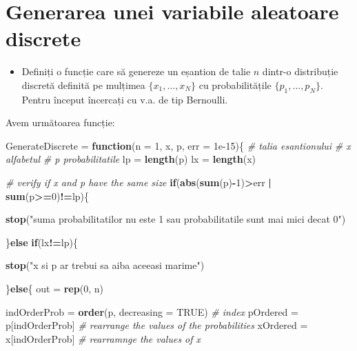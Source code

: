 \documentclass[]{article}
\newenvironment{Shaded}{\begin{snugshade}}{\end{snugshade}}
\newcommand{\KeywordTok}[1]{\textcolor[rgb]{0.13,0.29,0.53}{\textbf{#1}}}
\newcommand{\DataTypeTok}[1]{\textcolor[rgb]{0.13,0.29,0.53}{#1}}
\newcommand{\DecValTok}[1]{\textcolor[rgb]{0.00,0.00,0.81}{#1}}
\newcommand{\FloatTok}[1]{\textcolor[rgb]{0.00,0.00,0.81}{#1}}
\newcommand{\StringTok}[1]{\textcolor[rgb]{0.31,0.60,0.02}{#1}}
\newcommand{\CommentTok}[1]{\textcolor[rgb]{0.56,0.35,0.01}{\textit{#1}}}
\newcommand{\OtherTok}[1]{\textcolor[rgb]{0.56,0.35,0.01}{#1}}
\newcommand{\ControlFlowTok}[1]{\textcolor[rgb]{0.13,0.29,0.53}{\textbf{#1}}}
\newcommand{\OperatorTok}[1]{\textcolor[rgb]{0.81,0.36,0.00}{\textbf{#1}}}
\newcommand{\NormalTok}[1]{#1}
\newenvironment{frshaded*}{%
  \def\FrameCommand{\fboxrule=\FrameRule\fboxsep=\FrameSep \fcolorbox{framecolor}{shadecolor1}}%
  \MakeFramed {\advance\hsize-\width \FrameRestore}}%
{\endMakeFramed}
\newenvironment{rmdblock}[1]
  {\begin{frshaded*}
  \begin{itemize}
  \renewcommand{\labelitemi}{
    \raisebox{-.7\height}[0pt][0pt]{
      {\setkeys{Gin}{width=2em,keepaspectratio}\texttt{[image: images/icons/\#1]}}
    }
  }
  \item
  }
  {
  \end{itemize}
  \end{frshaded*}
  }
\newenvironment{rmdexercise}
  {\begin{rmdblock}{exercise}}
  {\end{rmdblock}}
\begin{document}
\section{Generarea unei variabile aleatoare
discrete}\label{generarea-unei-variabile-aleatoare-discrete}

\begin{rmdexercise}
Definiți o funcție care să genereze un eșantion de talie \(n\) dintr-o
distribuție discretă definită pe mulțimea \(\{x_1,\dots,x_N\}\) cu
probabilitățile \(\{p_1,\dots,p_N\}\). Pentru început încercați cu v.a.
de tip Bernoulli.
\end{rmdexercise}

Avem următoarea funcție:

\begin{Shaded}
\begin{Highlighting}[]
\NormalTok{GenerateDiscrete =}\StringTok{ }\ControlFlowTok{function}\NormalTok{(}\DataTypeTok{n =} \DecValTok{1}\NormalTok{, x, p, }\DataTypeTok{err =} \FloatTok{1e-15}\NormalTok{)\{}
  \CommentTok{# talia esantionului}
  \CommentTok{# x alfabetul }
  \CommentTok{# p probabilitatile}
\NormalTok{  lp =}\StringTok{ }\KeywordTok{length}\NormalTok{(p)}
\NormalTok{  lx =}\StringTok{ }\KeywordTok{length}\NormalTok{(x)}
  
  \CommentTok{# verify if x and p have the same size }
  \ControlFlowTok{if}\NormalTok{(}\KeywordTok{abs}\NormalTok{(}\KeywordTok{sum}\NormalTok{(p)}\OperatorTok{-}\DecValTok{1}\NormalTok{)}\OperatorTok{>}\NormalTok{err }\OperatorTok{|}\StringTok{ }\KeywordTok{sum}\NormalTok{(p}\OperatorTok{>=}\DecValTok{0}\NormalTok{)}\OperatorTok{!=}\NormalTok{lp)\{}
    
    \KeywordTok{stop}\NormalTok{(}\StringTok{"suma probabilitatilor nu este 1 sau probabilitatile sunt mai mici decat 0"}\NormalTok{)}
    
\NormalTok{  \}}\ControlFlowTok{else} \ControlFlowTok{if}\NormalTok{(lx}\OperatorTok{!=}\NormalTok{lp)\{}
    
    \KeywordTok{stop}\NormalTok{(}\StringTok{"x si p ar trebui sa aiba aceeasi marime"}\NormalTok{)}
    
\NormalTok{  \}}\ControlFlowTok{else}\NormalTok{\{}
\NormalTok{    out =}\StringTok{ }\KeywordTok{rep}\NormalTok{(}\DecValTok{0}\NormalTok{, n)}
    
\NormalTok{    indOrderProb =}\StringTok{ }\KeywordTok{order}\NormalTok{(p, }\DataTypeTok{decreasing =} \OtherTok{TRUE}\NormalTok{) }\CommentTok{# index}
\NormalTok{    pOrdered =}\StringTok{ }\NormalTok{p[indOrderProb] }\CommentTok{# rearrange the values of the probabilities }
\NormalTok{    xOrdered =}\StringTok{ }\NormalTok{x[indOrderProb] }\CommentTok{# rearramnge the values of x}
    

\end{Highlighting}
\end{Shaded}
\end{document}
